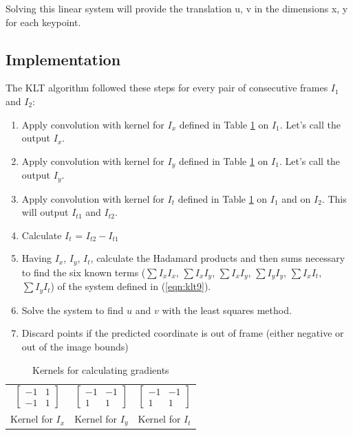 \documentclass[]{IEEEtran}
\begin{document}
Solving this linear system will provide the translation u, v in the dimensions x, y for each keypoint.

\subsection{Implementation}
The KLT algorithm followed these steps for every pair of consecutive frames $I_1$ and $I_2$:
\begin{enumerate}
\item Apply convolution with kernel for $I_x$ defined in Table \ref{table:kernels} on $I_1$. Let's call the output $I_x$.
\item Apply convolution with kernel for $I_y$ defined in Table \ref{table:kernels} on $I_1$. Let's call the output $I_y$.
\item Apply convolution with kernel for $I_t$ defined in Table \ref{table:kernels} on $I_1$ and on $I_2$. This will output $I_{t1}$ and $I_{t2}$.
\item Calculate $I_t$ =  $I_{t2} - I_{t1}$
\item Having $I_x$, $I_y$, $I_t$, calculate the Hadamard products and then sums necessary to find the six known terms ($\sum I_x I_x$, $\sum I_x I_y$, $\sum I_x I_y$, $\sum I_y I_y$, $\sum I_x I_t$, $\sum I_y I_t$) of the system defined in (\ref{eqn:klt9}).
\item Solve the system to find $u$ and $v$ with the least squares method.
\item Discard points if the predicted coordinate is out of frame (either negative or out of the image bounds)
\end{enumerate}


\begin{table}
\centering
\begin{tabular}{c c c}
$\begin{bmatrix}
    -1 & 1 \\
    -1 & 1
    \end{bmatrix}$ & $\begin{bmatrix}
    -1 & -1 \\
    1 & 1
    \end{bmatrix}$  &
    $\begin{bmatrix}
    -1 & -1 \\
    1 & 1
    \end{bmatrix}$  \\
    Kernel for $I_x$ & Kernel for $I_y$ & Kernel for $I_t$  \\
\end{tabular}
\caption{Kernels for calculating gradients}
\label{table:kernels}
\end{table}
\end{document}
